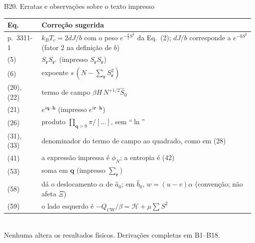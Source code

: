 \documentclass[10pt,aspectratio=169]{beamer}
\begin{document}
\begin{frame}{B20. Erratas e observações sobre o texto impresso}
  \footnotesize
  \begin{tabular}{@{}lp{}@{}}
    \toprule
    \textbf{Eq.} & \textbf{Correção sugerida}\\
    \midrule
    p.~3311-1 & $k_BT_c=2dJ/b$ com o peso $e^{-\frac b2S^2}$ da Eq.~(2); $dJ/b$ corresponde a $e^{-bS^2}$ (fator 2 na definição de $b$)\\
    (5) & $S_{\mathbf r}S_{\mathbf r'}$ (impresso $S_{\mathbf r}S_{\mathbf r}$)\\
    (6) & expoente $s\,(N-\sum_{\mathbf r}S_{\mathbf r}^2)$\\
    (20), (22) & termo de campo $\beta H\,N^{+1/2}\hat S_0$\\
    (21) & $e^{i\mathbf q\cdot\mathbf h}$ (impresso $e^{i\mathbf r\cdot\mathbf h}$)\\
    (26) & produto $\prod_{\mathbf q>0}\pi/[\dots]$, sem ``$\ln$''\\
    (31), (33) & denominador do termo de campo ao quadrado, como em (28)\\
    (41) & a expressão impressa é $\phi_N$; a entropia é (42)\\
    (53) & soma em $\mathbf q$ (impresso $\sum_{\mathbf r}$)\\
    (58) & dá o deslocamento $\alpha$ de $\hat a_0$; em $\hat b_0$, $w=(u-v)\alpha$ (convenção; não afeta $\Xi$)\\
    (59) & o lado esquerdo é $-Q_{CW}/\beta=\mathcal H+\mu\sum S^2$\\
    \bottomrule
  \end{tabular}\\[4pt]
  Nenhuma altera os resultados físicos. Derivações completas em B1--B18.
\end{frame}
\end{document}
